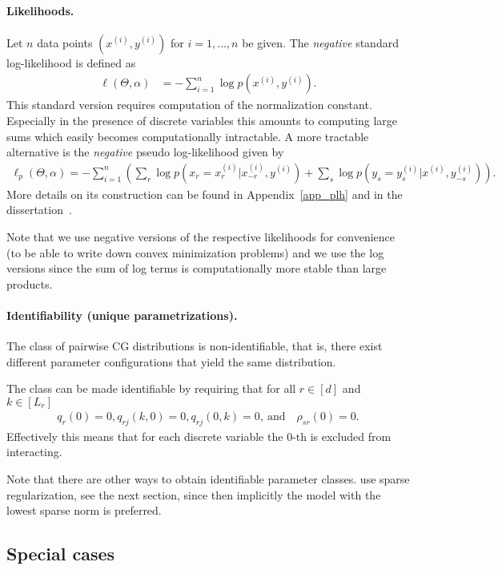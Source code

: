 \documentclass{article}
\newcommand{\bPr}[1]{\ensuremath{\left(#1 \right)}} %
\begin{document}
\paragraph{Likelihoods.}
Let $n$ data points $(x^{(i)}, y^{(i)})$ for $i=1,\ldots, n$ be given. 
The \emph{negative} standard log-likelihood is defined as
\begin{align*}
\ell(\Theta, \alpha) &= -\sum_{i=1}^n \log p(x^{(i)}, y^{(i)}).
\end{align*}
This standard version requires computation of the normalization constant. Especially in the presence of discrete variables this amounts to computing large sums which easily becomes computationally intractable. A more tractable alternative is the
\emph{negative} pseudo log-likelihood given by
\begin{align}
 \ell_p(\Theta, \alpha) = -\sum_{i=1}^n \bPr{\sum_r \log p(x_r = x_r^{(i)}|x_{-r}^{(i)},y^{(i)}) + \sum_s \log p(y_s = y_s^{(i)}|x^{(i)},y_{-s}^{(i)}) } . \label{plh_pw}
\end{align}
More details on its construction can be found in Appendix~\ref{app_plh} and in the dissertation~\cite{nussbaum2021models}.


Note that we use negative versions of the respective likelihoods for convenience (to be able to write down convex minimization problems) and we use the log versions since the sum of log terms is computationally more stable than large products.

\paragraph{Identifiability (unique parametrizations).}
The class of pairwise CG distributions is non-identifiable, that is, there exist different parameter configurations that yield the same distribution.

The class can be made identifiable by requiring that for all $r\in[d]$ and $k\in[L_r]$
\begin{align}
q_r(0)=0, q_{rj}(k, 0)=0, q_{rj}(0, k)=0, \:\text{and}\quad \rho_{sr}(0)=0. \label{ident}
\end{align}
Effectively this means that for each discrete variable the $0$-th is excluded from interacting. 

Note that there are other ways to obtain identifiable parameter classes. \cite{lee2015learning} use sparse regularization, see the next section, since then implicitly the model with the lowest sparse norm is preferred.


\subsection{Special cases}
\end{document}
